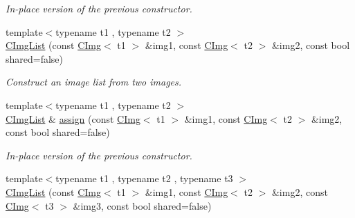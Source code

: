 \begin{DoxyCompactItemize}
\begin{DoxyCompactList}\small\item\em In-\/place version of the previous constructor. \item\end{DoxyCompactList}\item 
\hypertarget{structcimg__library_1_1_c_img_list_a3c8c35d345ccc07c5f5ad210ec06c19e}{
{\footnotesize template$<$typename t1 , typename t2 $>$ }\\\hyperlink{structcimg__library_1_1_c_img_list_a3c8c35d345ccc07c5f5ad210ec06c19e}{CImgList} (const \hyperlink{structcimg__library_1_1_c_img}{CImg}$<$ t1 $>$ \&img1, const \hyperlink{structcimg__library_1_1_c_img}{CImg}$<$ t2 $>$ \&img2, const bool shared=false)}
\label{structcimg__library_1_1_c_img_list_a3c8c35d345ccc07c5f5ad210ec06c19e}

\begin{DoxyCompactList}\small\item\em Construct an image list from two images. \item\end{DoxyCompactList}\item 
\hypertarget{structcimg__library_1_1_c_img_list_a34848bfb2177658d218c4bfe4eb96c7d}{
{\footnotesize template$<$typename t1 , typename t2 $>$ }\\\hyperlink{structcimg__library_1_1_c_img_list}{CImgList} \& \hyperlink{structcimg__library_1_1_c_img_list_a34848bfb2177658d218c4bfe4eb96c7d}{assign} (const \hyperlink{structcimg__library_1_1_c_img}{CImg}$<$ t1 $>$ \&img1, const \hyperlink{structcimg__library_1_1_c_img}{CImg}$<$ t2 $>$ \&img2, const bool shared=false)}
\label{structcimg__library_1_1_c_img_list_a34848bfb2177658d218c4bfe4eb96c7d}

\begin{DoxyCompactList}\small\item\em In-\/place version of the previous constructor. \item\end{DoxyCompactList}\item 
\hypertarget{structcimg__library_1_1_c_img_list_a35672e157078227def997fbd0d193fa6}{
{\footnotesize template$<$typename t1 , typename t2 , typename t3 $>$ }\\\hyperlink{structcimg__library_1_1_c_img_list_a35672e157078227def997fbd0d193fa6}{CImgList} (const \hyperlink{structcimg__library_1_1_c_img}{CImg}$<$ t1 $>$ \&img1, const \hyperlink{structcimg__library_1_1_c_img}{CImg}$<$ t2 $>$ \&img2, const \hyperlink{structcimg__library_1_1_c_img}{CImg}$<$ t3 $>$ \&img3, const bool shared=false)}
\label{structcimg__library_1_1_c_img_list_a35672e157078227def997fbd0d193fa6}


\end{DoxyCompactItemize}
